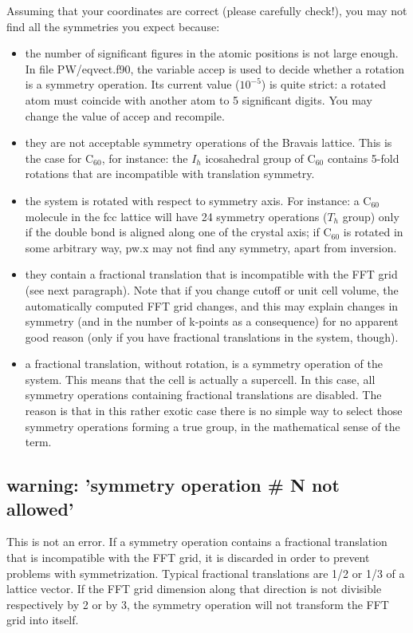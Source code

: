\documentclass[12pt,a4paper]{article}
\begin{document}
Assuming that your coordinates are correct (please carefully check!),
you may not find all the symmetries you expect because:
\begin{itemize}
\item the number of significant figures in the atomic positions is not
  large enough. In file PW/eqvect.f90, the variable accep is used to
  decide whether a rotation is a symmetry operation. Its current value
  ($10^{-5}$) is quite strict: a rotated atom must coincide with
  another atom to 5 significant digits. You may change the value of
  accep and recompile. 
\item they are not acceptable symmetry operations of the Bravais
  lattice. This is the case for C$_{60}$, for instance: the $I_h$
  icosahedral group of C$_{60}$ contains 5-fold rotations that are
  incompatible with translation symmetry.  
\item  the system is rotated with respect to symmetry axis. For
  instance: a C$_{60}$ molecule in the fcc lattice will have 24
  symmetry operations ($T_h$ group) only if the double bond is
  aligned along one of the crystal axis; if C$_{60}$ is rotated
  in some arbitrary way, pw.x may not find any symmetry, apart from
  inversion. 
\item they contain a fractional translation that is incompatible with
  the FFT grid (see next paragraph). Note that if you change cutoff or
  unit cell volume, the automatically computed FFT grid changes, and
  this may explain changes in symmetry (and in the number of k-points
  as a consequence) for no apparent good reason (only if you have
  fractional translations in the system, though). 
\item a fractional translation, without rotation, is a symmetry
  operation of the system. This means that the cell is actually a
  supercell. In this case, all symmetry operations containing
  fractional translations are disabled. The reason is that in this
  rather exotic case there is no simple way to select those symmetry
  operations forming a true group, in the mathematical sense of the
  term. 
\end{itemize}

\subsection{warning: 'symmetry operation \# N not allowed'}
This is not an error.  If a symmetry operation contains a fractional
translation that is incompatible with the FFT grid, it is discarded in
order to prevent problems with symmetrization. Typical fractional 
translations are 1/2 or 1/3 of a lattice vector. If the FFT grid
dimension along that direction is not divisible respectively by 2 or
by 3, the symmetry operation will not transform the FFT grid into
itself. 
\end{document}
